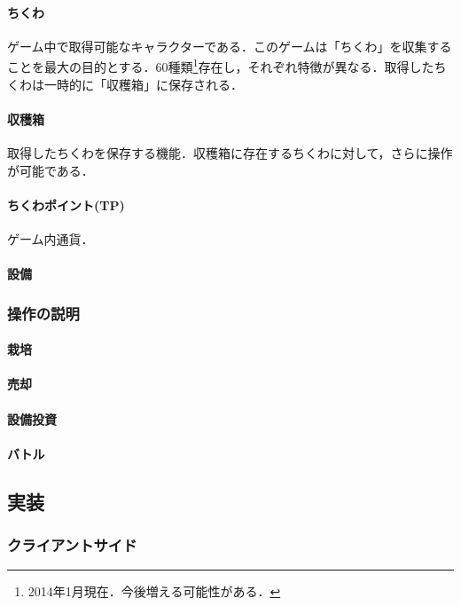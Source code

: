 \documentclass[a4paper,11pt]{jsarticle}
\begin{document}
\paragraph{ちくわ}
ゲーム中で取得可能なキャラクターである．このゲームは「ちくわ」を収集することを最大の目的とする．60種類\footnote{2014年1月現在．今後増える可能性がある．}存在し，それぞれ特徴が異なる．取得したちくわは一時的に「収穫箱」に保存される．

\paragraph{収穫箱}
取得したちくわを保存する機能．収穫箱に存在するちくわに対して，さらに操作が可能である．

\paragraph{ちくわポイント(TP)}
ゲーム内通貨．

\paragraph{設備}


\subsubsection{操作の説明}
\paragraph{栽培}

\paragraph{売却}

\paragraph{設備投資}

\paragraph{バトル}



\subsection{実装}
\subsubsection{クライアントサイド}
\end{document}
